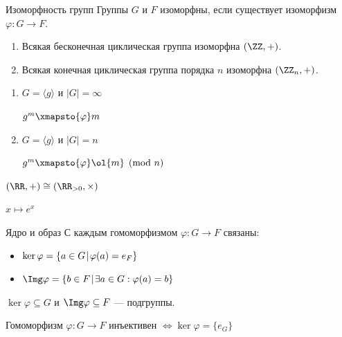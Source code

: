 \begin{defn}{Изоморфность групп}{}
    Группы \( G \) и \( F \) изоморфны,
    если существует изоморфизм \( \varphi : G \to F \).
\end{defn}

\begin{thrm}{}{}
    \begin{enumerate}
        \item
            Всякая бесконечная циклическая группа изоморфна \( (\ZZ, +) \).
        \item
            Всякая конечная циклическая группа порядка \( n \) изоморфна \( (\ZZ_n, +) \).
    \end{enumerate}
\end{thrm}

\begin{enumerate}
    \item
        \( G = \langle g \rangle \) и \( |G| = \infty \)

        \( g^m \xmapsto{\varphi} m \)
    \item
        \( G = \langle g \rangle \) и \( |G| = n \)

        \( g^m \xmapsto{\varphi} \ol{m} \pmod n \)
\end{enumerate}

\begin{example}{}{}
    \( (\RR, +) \cong (\RR_{> 0}, \times) \)

    \( x \mapsto e^x \)
\end{example}

\begin{defn}{Ядро и образ}{}
    С каждым гомоморфизмом \( \varphi : G \to F \) связаны:
    \begin{itemize}
        \item
            \( \ker \varphi = \{ a \in G \: \vline \: \varphi(a) = e_F \} \)
        \item
            \( \Img \varphi = \{ b \in F \: \vline \: \exists a \in G : \varphi(a) = b \} \)
    \end{itemize}
\end{defn}

\begin{exercise}{}{}
    \( \ker \varphi \subseteq G \) и \( \Img \varphi \subseteq F \) --- подгруппы.
\end{exercise}

\begin{lemma}{}{}
    Гомоморфизм \( \varphi : G \to F \) инъективен \( \Leftrightarrow \ker \varphi = \{ e_G \} \)
\end{lemma}

